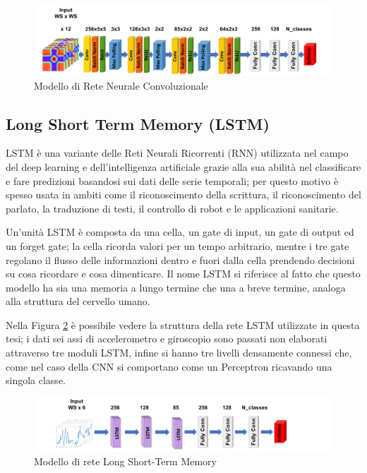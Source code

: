 \begin{figure}[!htb]
    \centering
    \includegraphics[width=\textwidth]{figure/cnn_model.png}
    \caption{Modello di Rete Neurale Convoluzionale}
    \label{fig:cnn-model}
\end{figure}

\subsection{Long Short Term Memory (LSTM)}

LSTM è una variante delle Reti Neurali Ricorrenti (RNN) utilizzata nel campo del deep learning e dell'intelligenza artificiale grazie alla sua abilità nel classificare e fare predizioni basandosi 
sui dati delle serie temporali; per questo motivo è spesso usata in ambiti come il riconoscimento della scrittura, il riconoscimento del parlato, la traduzione di testi, il controllo di robot e 
le applicazioni sanitarie.

Un'unità LSTM è composta da una cella, un gate di input, un gate di output ed un forget gate; la cella ricorda valori per un tempo arbitrario, mentre i tre gate regolano il flusso delle informazioni 
dentro e fuori dalla cella prendendo decisioni su cosa ricordare e cosa dimenticare. Il nome LSTM si riferisce al fatto che questo modello ha sia una memoria a lungo termine che una a breve termine, 
analoga alla struttura del cervello umano.

Nella Figura \ref{fig:lstm-model} è possibile vedere la struttura della rete LSTM utilizzate in questa tesi; i dati sei assi di accelerometro e giroscopio sono passati non elaborati attraverso tre moduli 
LSTM, infine si hanno tre livelli densamente connessi che, come nel caso della CNN si comportano come un Perceptron ricavando una singola classe.

\begin{figure}[!htb]
    \centering
    \includegraphics[width=\textwidth]{figure/lstm_model.png}
    \caption{Modello di rete Long Short-Term Memory}
    \label{fig:lstm-model}
\end{figure}

